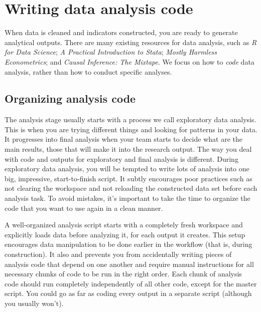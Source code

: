 
\section{Writing data analysis code}

When data is cleaned and indicators constructed, you are ready to generate analytical outputs.
There are many existing resources for data analysis, such as
\textit{R for Data Science};
\textit{A Practical Introduction to Stata};
\textit{Mostly Harmless Econometrics};
and \textit{Causal Inference: The Mixtape}.
We focus on how to \textit{code} data analysis, rather than how to conduct specific analyses.

\subsection{Organizing analysis code}

The analysis stage usually starts with a process we call exploratory data analysis.
This is when you are trying different things and looking for patterns in your data.
It progresses into final analysis when your team starts to decide what are the main results,
those that will make it into the research output.
The way you deal with code and outputs for exploratory and final analysis is different.
During exploratory data analysis,
you will be tempted to write lots of analysis into one big, impressive, start-to-finish script.
It subtly encourages poor practices such as not clearing the workspace and not reloading the constructed data set before each analysis task.
To avoid mistakes, it's important to take the time
to organize the code that you want to use again in a clean manner.

A well-organized analysis script starts with a completely fresh workspace
and explicitly loads data before analyzing it, for each output it creates.
This setup encourages data manipulation to be done earlier in the workflow
(that is, during construction).
It also and prevents you from accidentally writing pieces of analysis code that depend on one another
and require manual instructions for all necessary chunks of code to be run in the right order.
Each chunk of analysis code should run completely independently of all other code,
except for the master script.
You could go as far as coding every output in a separate script (although you usually won't).

